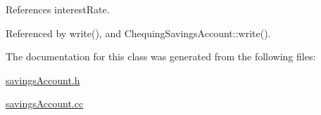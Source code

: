 References interestRate.

Referenced by write(), and ChequingSavingsAccount::write().

The documentation for this class was generated from the following files:\begin{CompactItemize}
\item 
\hyperlink{savingsAccount_8h}{savingsAccount.h}\item 
\hyperlink{savingsAccount_8cc}{savingsAccount.cc}\end{CompactItemize}

